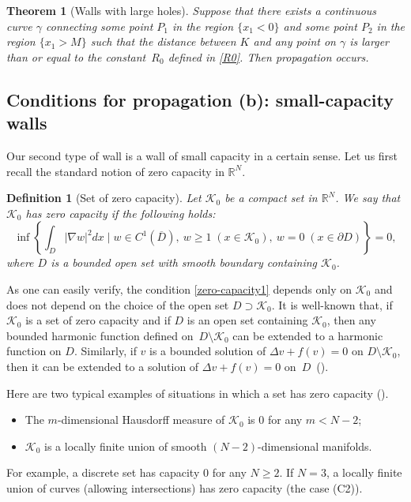 \documentclass[a4paper,12pt,fullpage]{article}
\numberwithin{equation}{section}
\newtheorem{Thm}{Theorem}
\newtheorem{Def}[Lemma]{Definition}
\def\R{{\mathbb R}}
\begin{document}
\begin{Thm}[Walls with large holes]\label{th:large-holes}
Suppose that there exists a continuous curve $\gamma$ connecting some point $P_1$ in the region $\{x_1<0\}$ and some point $P_2$ in the region $\{x_1>M\}$ such that the distance between $K$ and any point on $\gamma$ is larger than or equal to the constant~$R_0$ defined in \eqref{R0}. Then propagation occurs.
\end{Thm}


\subsection{Conditions for propagation (b): small-capacity walls}
\label{ss:main-small-capacity}

Our second type of wall is a wall of small capacity in a certain sense. Let us first recall the standard notion of zero capacity in $\R^N$.

\begin{Def}[Set of zero capacity]\label{def:zero-capacity}
Let ${\mathcal K}_0$ be a compact set in $\R^N$. We say that ${\mathcal K}_0$ has zero capacity if the following holds:
\begin{equation}\label{zero-capacity1}
\inf\left\{\int_{D} |\nabla w|^2 dx \;\Big |\; w\in C^1(\overline{D}),\ w\geq 1\;(x\in {\mathcal K}_0),\ w=0\;(x\in \partial D) \right\}=0,
\end{equation}
where $D$ is a bounded open set with smooth boundary containing ${\mathcal K}_0$. 
\end{Def}

As one can easily verify, the condition \eqref{zero-capacity1} depends only on ${\mathcal K}_0$ and does not depend on the choice of the open set $D\supset {\mathcal K}_0$. It is well-known that, if ${\mathcal K}_0$ is a set of zero capacity and if $D$ is an open set containing ${\mathcal K}_0$, then any bounded harmonic function defined on~$D\setminus {\mathcal K}_0$ can be extended to a harmonic function on $D$. Similarly, if $v$ is a bounded solution of $\Delta v+f(v)=0$ on $D\setminus {\mathcal K}_0$, then it can be extended to a solution of $\Delta v+f(v)=0$ on~$D$~(\cite{S}).

Here are two typical examples of situations in which a set has zero capacity (\cite{Po}).
\begin{itemize}
\item[(C1)] The $m$-dimensional Hausdorff measure of ${\mathcal K}_0$ is $0$ for any $m<N-2$;
\item[(C2)] ${\mathcal K}_0$ is a locally finite union of smooth $(N-2)$-dimensional manifolds.
\end{itemize}
For example, a discrete set has capacity $0$ for any $N\geq 2$. If $N=3$, a locally finite union of curves (allowing intersections) has zero capacity (the case (C2)).
\end{document}
